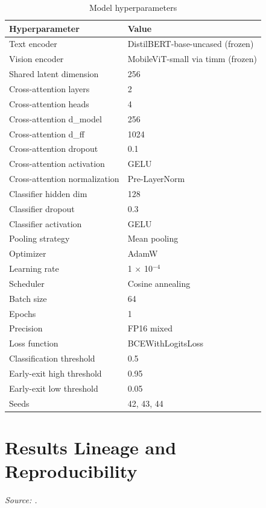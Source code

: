 \documentclass[10pt,twoside]{article}
\begin{document}
\begin{table}[h]
\centering
\caption{Model hyperparameters}
\label{tab:apphyper}
\small
\begin{tabular}{ll}\toprule
Hyperparameter & Value \\
\midrule
Text encoder & DistilBERT-base-uncased (frozen) \\
Vision encoder & MobileViT-small via timm (frozen) \\
Shared latent dimension & 256 \\
Cross-attention layers & 2 \\
Cross-attention heads & 4 \\
Cross-attention d\_model & 256 \\
Cross-attention d\_ff & 1024 \\
Cross-attention dropout & 0.1 \\
Cross-attention activation & GELU \\
Cross-attention normalization & Pre-LayerNorm \\
Classifier hidden dim & 128 \\
Classifier dropout & 0.3 \\
Classifier activation & GELU \\
Pooling strategy & Mean pooling \\
Optimizer & AdamW \\
Learning rate & 1 $\times$ 10$^{-4}$ \\
Scheduler & Cosine annealing \\
Batch size & 64 \\
Epochs & 1 \\
Precision & FP16 mixed \\
Loss function & BCEWithLogitsLoss \\
Classification threshold & 0.5 \\
Early-exit high threshold & 0.95 \\
Early-exit low threshold & 0.05 \\
Seeds & 42, 43, 44 \\
\bottomrule
\end{tabular}

\end{table}

\section{Results Lineage and Reproducibility}\label{app:C}

\emph{Source: .}
\end{document}
